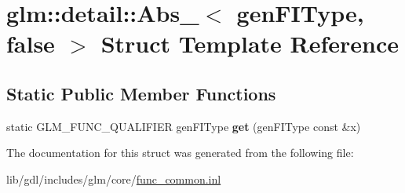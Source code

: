 \hypertarget{structglm_1_1detail_1_1_abs___3_01gen_f_i_type_00_01false_01_4}{}\section{glm\+:\+:detail\+:\+:Abs\+\_\+$<$ gen\+F\+I\+Type, false $>$ Struct Template Reference}
\label{structglm_1_1detail_1_1_abs___3_01gen_f_i_type_00_01false_01_4}
\subsection*{Static Public Member Functions}
\begin{DoxyCompactItemize}
\item 
\hypertarget{structglm_1_1detail_1_1_abs___3_01gen_f_i_type_00_01false_01_4_a28529a9a752a62bc1fb99045c5667e3a}{}static G\+L\+M\+\_\+\+F\+U\+N\+C\+\_\+\+Q\+U\+A\+L\+I\+F\+I\+E\+R gen\+F\+I\+Type {\bfseries get} (gen\+F\+I\+Type const \&x)\label{structglm_1_1detail_1_1_abs___3_01gen_f_i_type_00_01false_01_4_a28529a9a752a62bc1fb99045c5667e3a}

\end{DoxyCompactItemize}


The documentation for this struct was generated from the following file\+:\begin{DoxyCompactItemize}
\item 
lib/gdl/includes/glm/core/\hyperlink{func__common_8inl}{func\+\_\+common.\+inl}\end{DoxyCompactItemize}
